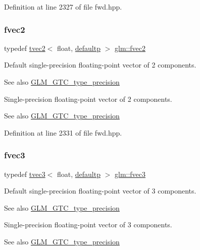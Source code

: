 Definition at line 2327 of file fwd.\+hpp.

\mbox{\label{group__gtc__type__precision_ga83fb34639f810d0c9240cf7ff0180e20}} 
\subsubsection{\texorpdfstring{fvec2}{fvec2}}
{\footnotesize\ttfamily typedef \mbox{\hyperlink{structglm_1_1tvec2}{tvec2}}$<$ float, \mbox{\hyperlink{namespaceglm_a0f04f086094c747d227af4425893f545a9d21ccd8b5a009ec7eb7677befc3bf51}{defaultp}} $>$ \mbox{\hyperlink{group__gtc__type__precision_ga83fb34639f810d0c9240cf7ff0180e20}{glm\+::fvec2}}}

Default single-\/precision floating-\/point vector of 2 components. \begin{DoxySeeAlso}{See also}
\mbox{\hyperlink{group__gtc__type__precision}{G\+L\+M\+\_\+\+G\+T\+C\+\_\+type\+\_\+precision}}
\end{DoxySeeAlso}
Single-\/precision floating-\/point vector of 2 components. \begin{DoxySeeAlso}{See also}
\mbox{\hyperlink{group__gtc__type__precision}{G\+L\+M\+\_\+\+G\+T\+C\+\_\+type\+\_\+precision}} 
\end{DoxySeeAlso}


Definition at line 2331 of file fwd.\+hpp.

\mbox{\label{group__gtc__type__precision_ga8480fdaa7fb8e177e57b367be79863d8}} 
\subsubsection{\texorpdfstring{fvec3}{fvec3}}
{\footnotesize\ttfamily typedef \mbox{\hyperlink{structglm_1_1tvec3}{tvec3}}$<$ float, \mbox{\hyperlink{namespaceglm_a0f04f086094c747d227af4425893f545a9d21ccd8b5a009ec7eb7677befc3bf51}{defaultp}} $>$ \mbox{\hyperlink{group__gtc__type__precision_ga8480fdaa7fb8e177e57b367be79863d8}{glm\+::fvec3}}}

Default single-\/precision floating-\/point vector of 3 components. \begin{DoxySeeAlso}{See also}
\mbox{\hyperlink{group__gtc__type__precision}{G\+L\+M\+\_\+\+G\+T\+C\+\_\+type\+\_\+precision}}
\end{DoxySeeAlso}
Single-\/precision floating-\/point vector of 3 components. \begin{DoxySeeAlso}{See also}
\mbox{\hyperlink{group__gtc__type__precision}{G\+L\+M\+\_\+\+G\+T\+C\+\_\+type\+\_\+precision}} 
\end{DoxySeeAlso}


